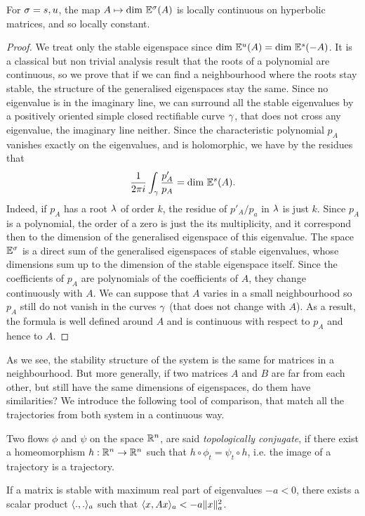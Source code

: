 \begin{theoreme}
For $\sigma=s,u$, the map $A\mapsto \text{dim }\mathbb{E}^\sigma(A)$ is locally continuous on hyperbolic matrices, and so locally constant.
\end{theoreme}
\begin{proof}
We treat only the stable eigenspace since $\text{dim }\mathbb{E}^u(A) =\text{dim }\mathbb{E}^s(-A)$. It is a classical but non trivial analysis result that the roots of a polynomial are continuous, so we prove that if we can find a neighbourhood where the roots stay stable, the structure of the generalised eigenspaces stay the same. Since no eigenvalue is in the imaginary line, we can surround all the stable eigenvalues by a positively oriented simple closed rectifiable curve $\gamma$, that does not cross any eigenvalue, the imaginary line neither. Since the characteristic polynomial $p_A$ vanishes exactly on the eigenvalues, and is holomorphic, we have by the residues that 
$$\frac{1}{2\pi i}\int_{\gamma} \frac{p_A'}{p_A}
= \text{dim }\mathbb{E}^s(A) .$$
Indeed, if $p_A$ has a root $\lambda$ of order $k$, the residue of $p'_A/p_a$ in $\lambda$ is just $k$. Since $p_A$ is a polynomial, the order of a zero is just the its multiplicity, and it correspond then to the dimension of the generalised eigenspace of this eigenvalue. The space $\mathbb{E}^\sigma$ is a direct sum of the generalised eigenspaces of stable eigenvalues, whose dimensions sum up to the dimension of the stable eigenspace itself. Since the coefficients of $p_A$ are polynomials of the coefficients of $A$, they change continuously with $A$. We can suppose that $A$ varies in a small neighbourhood so $p_A$ still do not vanish in the curves $\gamma$ (that does not change with $A$). As a result, the formula is well defined around $A$ and is continuous with respect to $p_A$ and hence to $A$.
\end{proof}
 As we see, the stability structure of the system is the same for matrices in a neighbourhood. But more generally, if two matrices $A$ and $B$ are far from each other, but still have the same dimensions of eigenspaces, do them have similarities? We introduce the following tool of comparison, that match all the trajectories from both system in a continuous way. 
 \begin{definition}
 Two flows $\phi$ and $\psi$ on the space $\mathbb{R}^n$, are said \emph{topologically conjugate}, if there exist a homeomorphism $h:\mathbb{R}^n\to\mathbb{R}^n$ such that 
 $h\circ \phi_t = \psi_t\circ h$, i.e. the image of a trajectory is a trajectory. 
 \end{definition}
 \begin{lemme} \label{lem:ps}
If a matrix is stable with maximum real part of eigenvalues $-a<0$, there exists a scalar product $\langle.,.\rangle_a$ such that $\langle x,Ax\rangle_a<-a\|x\|_a^2$.
\end{lemme}
